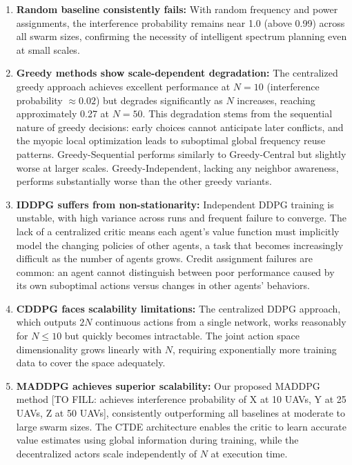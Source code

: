 \documentclass[conference]{IEEEtran}
\begin{document}
\begin{enumerate}
    \item \textbf{Random baseline consistently fails:} With random frequency and power assignments, the interference probability remains near 1.0 (above 0.99) across all swarm sizes, confirming the necessity of intelligent spectrum planning even at small scales.
    
    \item \textbf{Greedy methods show scale-dependent degradation:} The centralized greedy approach achieves excellent performance at $N=10$ (interference probability $\approx 0.02$) but degrades significantly as $N$ increases, reaching approximately 0.27 at $N=50$. This degradation stems from the sequential nature of greedy decisions: early choices cannot anticipate later conflicts, and the myopic local optimization leads to suboptimal global frequency reuse patterns. Greedy-Sequential performs similarly to Greedy-Central but slightly worse at larger scales. Greedy-Independent, lacking any neighbor awareness, performs substantially worse than the other greedy variants.
    
    \item \textbf{IDDPG suffers from non-stationarity:} Independent DDPG training is unstable, with high variance across runs and frequent failure to converge. The lack of a centralized critic means each agent's value function must implicitly model the changing policies of other agents, a task that becomes increasingly difficult as the number of agents grows. Credit assignment failures are common: an agent cannot distinguish between poor performance caused by its own suboptimal actions versus changes in other agents' behaviors.
    
    \item \textbf{CDDPG faces scalability limitations:} The centralized DDPG approach, which outputs $2N$ continuous actions from a single network, works reasonably for $N \leq 10$ but quickly becomes intractable. The joint action space dimensionality grows linearly with $N$, requiring exponentially more training data to cover the space adequately.
    
    \item \textbf{MADDPG achieves superior scalability:} Our proposed MADDPG method [TO FILL: achieves interference probability of X at 10 UAVs, Y at 25 UAVs, Z at 50 UAVs], consistently outperforming all baselines at moderate to large swarm sizes. The CTDE architecture enables the critic to learn accurate value estimates using global information during training, while the decentralized actors scale independently of $N$ at execution time.
\end{enumerate}
\end{document}

